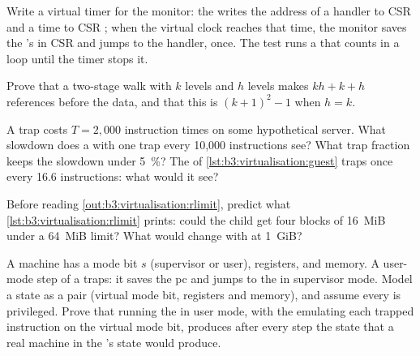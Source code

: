 \begin{exercise}[$\star\star$]\label{exo:b3:virtualisation:6}
Write a virtual timer for the monitor: the  writes the address of a handler to CSR  and a time to CSR ; when the virtual clock reaches that time, the monitor saves the 's  in CSR  and jumps to the handler, once. The test runs a  that counts in a loop until the timer stops it.
\end{exercise}

\begin{exercise}[$\star\star$]\label{exo:b3:virtualisation:7}
Prove that a two-stage walk with $k$  levels and $h$  levels makes $kh + k + h$ references before the data, and that this is $(k + 1)^2 - 1$ when $h = k$.
\end{exercise}

\begin{exercise}[$\star\star$]\label{exo:b3:virtualisation:8}
A trap costs $T = 2{,}000$ instruction times on some hypothetical server. What slowdown does a  with one trap every 10,000 instructions see? What trap fraction keeps the slowdown under 5~\%? The  of \cref{lst:b3:virtualisation:guest} traps once every 16.6 instructions: what would it see?
\end{exercise}

\begin{exercise}[$\star\star$]\label{exo:b3:virtualisation:9}
Before reading \cref{out:b3:virtualisation:rlimit}, predict what \cref{lst:b3:virtualisation:rlimit} prints: could the child get four blocks of 16~MiB under a 64~MiB limit? What would change with  at 1~GiB?
\end{exercise}

\begin{exercise}[$\star\star\star$]\label{exo:b3:virtualisation:10}
A machine has a mode bit $s$ (supervisor or user), registers, and memory. A user-mode step of a  traps: it saves the pc and jumps to the  in supervisor mode. Model a  state as a pair (virtual mode bit, registers and memory), and assume every  is privileged. Prove that running the  in user mode, with the  emulating each trapped instruction on the virtual mode bit, produces after every step the state that a real machine in the 's state would produce.
\end{exercise}

